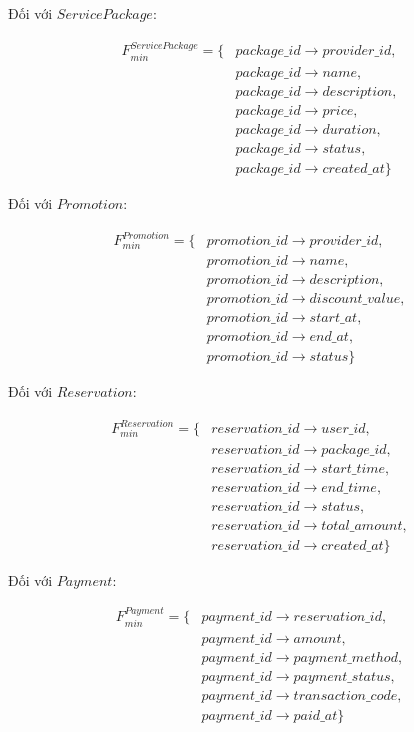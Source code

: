 Đối với $ServicePackage$:

\[
\begin{aligned}
	F_{min}^{ServicePackage}=\{&
	package\_id\rightarrow provider\_id,\\
	&package\_id\rightarrow name,\\
	&package\_id\rightarrow description,\\
	&package\_id\rightarrow price,\\
	&package\_id\rightarrow duration,\\
	&package\_id\rightarrow status,\\
	&package\_id\rightarrow created\_at
	\}
\end{aligned}
\]

Đối với $Promotion$:

\[
\begin{aligned}
	F_{min}^{Promotion}=\{&
	promotion\_id\rightarrow provider\_id,\\
	&promotion\_id\rightarrow name,\\
	&promotion\_id\rightarrow description,\\
	&promotion\_id\rightarrow discount\_value,\\
	&promotion\_id\rightarrow start\_at,\\
	&promotion\_id\rightarrow end\_at,\\
	&promotion\_id\rightarrow status
	\}
\end{aligned}
\]

Đối với $Reservation$:

\[
\begin{aligned}
	F_{min}^{Reservation}=\{&
	reservation\_id\rightarrow user\_id,\\
	&reservation\_id\rightarrow package\_id,\\
	&reservation\_id\rightarrow start\_time,\\
	&reservation\_id\rightarrow end\_time,\\
	&reservation\_id\rightarrow status,\\
	&reservation\_id\rightarrow total\_amount,\\
	&reservation\_id\rightarrow created\_at
	\}
\end{aligned}
\]

Đối với $Payment$:

\[
\begin{aligned}
	F_{min}^{Payment}=\{&
	payment\_id\rightarrow reservation\_id,\\
	&payment\_id\rightarrow amount,\\
	&payment\_id\rightarrow payment\_method,\\
	&payment\_id\rightarrow payment\_status,\\
	&payment\_id\rightarrow transaction\_code,\\
	&payment\_id\rightarrow paid\_at
	\}
\end{aligned}
\]

